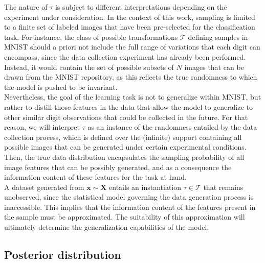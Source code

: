 The nature of $\tau$ is subject to different interpretations depending on the experiment
under consideration. In the context of this work, sampling is limited to a finite set of labeled images
that have been pre-selected for the classification task. For instance, the class of possible transformations
$\mathcal{T}$ defining samples in MNIST \cite{lecun1998mnist} should a priori not include 
the full range of variations that each digit can encompass, since the data collection 
experiment has already been performed. Instead, it would contain the set of possible subsets 
of $N$ images that can be drawn from the MNIST repository, as this reflects the 
true randomness to which the model is pushed to be invariant. \\

Nevertheless, the goal of the learning task is not to generalize within MNIST, but rather
to distill those features in the data that allow the model to generalize to other similar digit observations
that could be collected in the future. For that reason, we will interpret $\tau$ as an instance of the
randomness entailed by the data collection process, which is defined over the (infinite) support 
containing all possible images that can be generated under certain experimental conditions. 
Then, the true data distribution encapsulates the sampling probability of all image features 
that can be possibly generated, and as a consequence the information content of these features for
the task at hand. \\

A dataset generated from $\bm{x} \sim \bm{X}$ entails an instantiation $\tau \in \mathcal{T}$ that 
remains unobserved, since the statistical model governing the data generation process is 
inaccessible. This implies that the information content of the features present in the sample
must be approximated. The suitability of this approximation
will ultimately determine the generalization capabilities of the model. \\

\subsection{Posterior distribution}


